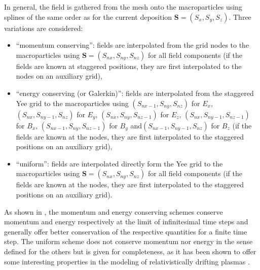 

In general, the field is gathered from the mesh onto the macroparticles
using splines of the same order as for the current deposition $\mathbf{S}=\left(S_{x},S_{y},S_{z}\right)$.
Three variations are considered:
\begin{itemize}
\item ``momentum conserving'': fields are interpolated from the grid nodes
to the macroparticles using $\mathbf{S}=\left(S_{nx},S_{ny},S_{nz}\right)$
for all field components (if the fields are known at staggered positions,
they are first interpolated to the nodes on an auxiliary grid),
\item ``energy conserving (or Galerkin)'': fields are interpolated from
the staggered Yee grid to the macroparticles using $\left(S_{nx-1},S_{ny},S_{nz}\right)$
for $E_{x}$, $\left(S_{nx},S_{ny-1},S_{nz}\right)$ for $E_{y}$,
$\left(S_{nx},S_{ny},S_{nz-1}\right)$ for $E_{z}$, $\left(S_{nx},S_{ny-1},S_{nz-1}\right)$
for $B_{x}$, $\left(S_{nx-1},S_{ny},S_{nz-1}\right)$ for $B{}_{y}$
and$\left(S_{nx-1},S_{ny-1},S_{nz}\right)$ for $B_{z}$ (if the fields
are known at the nodes, they are first interpolated to the staggered
positions on an auxiliary grid),
\item ``uniform'': fields are interpolated directly form the Yee grid
to the macroparticles using $\mathbf{S}=\left(S_{nx},S_{ny},S_{nz}\right)$
for all field components (if the fields are known at the nodes, they
are first interpolated to the staggered positions on an auxiliary
grid).
\end{itemize}
As shown in \cite{BirdsallLangdon,HockneyEastwoodBook,LewisJCP1972},
the momentum and energy conserving schemes conserve momentum and energy
respectively at the limit of infinitesimal time steps and generally
offer better conservation of the respective quantities for a finite
time step. The uniform scheme does not conserve momentum nor energy
in the sense defined for the others but is given for completeness,
as it has been shown to offer some interesting properties in the modeling
of relativistically drifting plasmas \cite{GodfreyJCP2013}.
